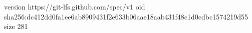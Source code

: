 version https://git-lfs.github.com/spec/v1
oid sha256:dc412dd0fa1ee6ab8909431f2e633b06aae18aab431f48c1d0cdbc1574219d55
size 281
